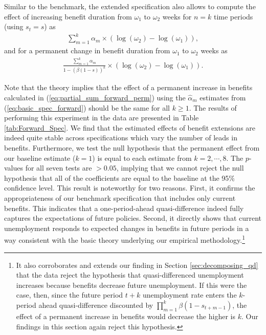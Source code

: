 \documentclass[12pt]{article}
\newcommand{\1}{\mathbf{1}}
\newcommand{\beq}{\begin{eqnarray}}
\newcommand{\eeq}{\end{eqnarray}}
\begin{document}
Similar to the benchmark, the extended specification also allows to compute the effect of increasing benefit duration from $\omega_1$ to $\omega_2$ weeks for $n = k$ time periods (using $s_t=s$) as
\beq
\sum_{m=1}^k \alpha_m \times\left(\log(\omega_2)-\log(\omega_1)\right), \label{eq:partial_sum_forward}
\eeq
and for a permanent change in benefit duration from $\omega_1$ to $\omega_2$ weeks as
\beq
\frac{\sum_{m=1}^k \alpha_m }{1- (\beta(1-s))^k}\times\left(\log(\omega_2)-\log(\omega_1)\right). \label{eq:partial_sum_forward_perm}
\eeq

Note that the theory implies that the effect of a permanent increase in benefits calculated in (\ref{eq:partial_sum_forward_perm}) using the $\hat{\alpha}_m$ estimates from (\ref{eq:basic_spec_forward}) should be the same for all $k \geq 1$. The results of performing this experiment in the data are presented in Table \ref{tab:Forward_Spec}. We find that the estimated effects of benefit extensions are indeed quite stable across specifications which vary the number of leads in benefits. Furthermore, we test the null hypothesis that the permanent effect from our baseline estimate ($k=1$) is equal to each estimate from $k=2,\cdots,8$. The $p$-values for all seven tests are $>0.05$, implying that we cannot reject the null hypothesis that all of the coefficients are equal to the baseline at the 95\% confidence level. This result is noteworthy for two reasons. First, it confirms the appropriateness of our benchmark specification that includes only current benefits. This indicates that a one-period-ahead quasi-difference indeed fully captures the expectations of future policies. Second, it directly shows that current unemployment responds to expected changes in benefits in future periods in a way consistent with the basic theory underlying our empirical methodology.\footnote{It also corroborates and extends our finding in Section \ref{sec:decomposing_qd} that the data reject the hypothesis that quasi-differenced unemployment increases because benefits decrease future unemployment. If this were the case, then, since the future period $t+k$ unemployment rate enters the $k$-period ahead quasi-difference discounted by $\prod_{m=1}^k \beta (1-s_{t+m-1})$, the effect of a permanent increase in benefits would decrease the higher is $k$. Our findings in this section again reject this hypothesis.
}
\end{document}
